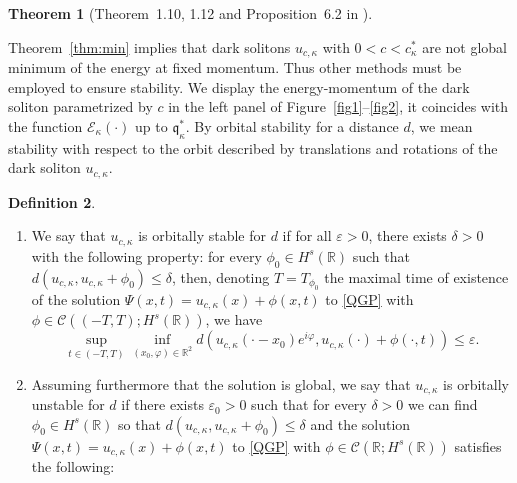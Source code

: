\documentclass[11pt]{article}
\newcommand{\R}{\mathbb{R}}
\newcommand{\boC}{\mathcal{C}}
\theoremstyle{plain}
\newtheorem{theorem}{Theorem}[section]
\theoremstyle{definition}
\newtheorem{definition}[theorem]{Definition}
\theoremstyle{remark}
\numberwithin{equation}{section}
\begin{document}
{\begin{theorem}[Theorem~1.10, 1.12 and Proposition~6.2 in \cite{delaire2023exotic}]
\begin{enumerate}
		\end{enumerate}
	\end{theorem}
	Theorem~\ref{thm:min} implies that dark solitons $u_{c,\kappa}$ with $0<c<c_\kappa^*$ are not global minimum of the energy at fixed momentum. Thus other methods must be employed to ensure stability. We display the energy-momentum of the dark soliton parametrized by $c$ in the left panel of Figure~\ref{fig1}--\ref{fig2}, it coincides with the function $\mathcal{E}_\kappa(\cdot)$ up to $\mathfrak{q}_\kappa^*$.
	By orbital stability for a distance $d$, we mean stability with respect to the orbit described by translations and rotations of the dark soliton $u_{c,\kappa}$.
	\begin{definition}\label{def:stabdef}\begin{enumerate}
			Let $s>2+1/2$ and $d$ be a distance on $\mathcal{X}(\R)$. The stability and instability for dark solitons is defined as follows.
			\item\label{item:stab} We say that $u_{c,\kappa}$ is orbitally stable for $d$ if for all $\varepsilon>0$, there exists $\delta>0$ with the following property:
			for every $\phi_0\in  H^{s}(\R)$ such that $d(u_{c,\kappa},u_{c,\kappa}+\phi_0)\leq\delta$, then, denoting $T=T_{\phi_0}$ the maximal time of existence of the solution $\Psi(x,t)=u_{c,\kappa}(x)+\phi(x,t)$ to \eqref{QGP} with $\phi\in\boC((-T,T); H^{s}(\R))$, we have
			\begin{equation}\label{def:stab}
				\sup_{t\in(-T,T)}\inf_{(x_0,\varphi)\in\R^2}d(u_{c,\kappa}(\cdot-x_0)e^{i\varphi},u_{c,\kappa}(\cdot)+\phi(\cdot,t))\leq\varepsilon.
			\end{equation}	
			\item\label{item:unstab}Assuming furthermore that the solution is global, we say that $u_{c,\kappa}$ is orbitally unstable for $d$ if there exists $\varepsilon_0>0$ such that for every $\delta>0$ we can find $\phi_0\in H^{s}(\R)$ so  that $d(u_{c,\kappa},u_{c,\kappa}+\phi_0)\leq\delta$ and the solution $\Psi(x,t)=u_{c,\kappa}(x)+\phi(x,t)$ to \eqref{QGP} with $\phi\in\boC(\R; H^{s}(\R))$ satisfies the following:

\end{enumerate}
\end{definition}}
\end{document}
